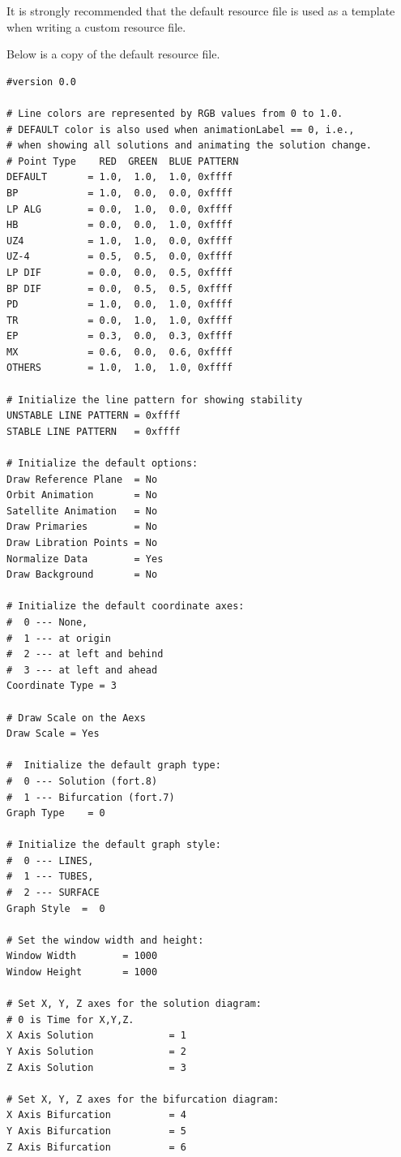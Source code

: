 It is strongly recommended that the default resource file is used as a template
when writing a custom resource file. 

Below is a copy of the default resource file. 
{\footnotesize
\begin{verbatim}
#version 0.0

# Line colors are represented by RGB values from 0 to 1.0.
# DEFAULT color is also used when animationLabel == 0, i.e.,
# when showing all solutions and animating the solution change.
# Point Type    RED  GREEN  BLUE PATTERN
DEFAULT       = 1.0,  1.0,  1.0, 0xffff
BP            = 1.0,  0.0,  0.0, 0xffff
LP ALG        = 0.0,  1.0,  0.0, 0xffff
HB            = 0.0,  0.0,  1.0, 0xffff
UZ4           = 1.0,  1.0,  0.0, 0xffff
UZ-4          = 0.5,  0.5,  0.0, 0xffff
LP DIF        = 0.0,  0.0,  0.5, 0xffff
BP DIF        = 0.0,  0.5,  0.5, 0xffff
PD            = 1.0,  0.0,  1.0, 0xffff
TR            = 0.0,  1.0,  1.0, 0xffff
EP            = 0.3,  0.0,  0.3, 0xffff
MX            = 0.6,  0.0,  0.6, 0xffff
OTHERS        = 1.0,  1.0,  1.0, 0xffff

# Initialize the line pattern for showing stability
UNSTABLE LINE PATTERN = 0xffff 
STABLE LINE PATTERN   = 0xffff

# Initialize the default options:
Draw Reference Plane  = No
Orbit Animation       = No
Satellite Animation   = No 
Draw Primaries        = No 
Draw Libration Points = No 
Normalize Data        = Yes 
Draw Background       = No

# Initialize the default coordinate axes:
#  0 --- None,
#  1 --- at origin
#  2 --- at left and behind
#  3 --- at left and ahead
Coordinate Type = 3

# Draw Scale on the Aexs
Draw Scale = Yes 

#  Initialize the default graph type:
#  0 --- Solution (fort.8)
#  1 --- Bifurcation (fort.7)
Graph Type    = 0

# Initialize the default graph style:
#  0 --- LINES,
#  1 --- TUBES,
#  2 --- SURFACE
Graph Style  =  0

# Set the window width and height:
Window Width        = 1000
Window Height       = 1000 

# Set X, Y, Z axes for the solution diagram:
# 0 is Time for X,Y,Z.
X Axis Solution             = 1
Y Axis Solution             = 2
Z Axis Solution             = 3

# Set X, Y, Z axes for the bifurcation diagram:
X Axis Bifurcation          = 4
Y Axis Bifurcation          = 5
Z Axis Bifurcation          = 6


\end{verbatim}}
